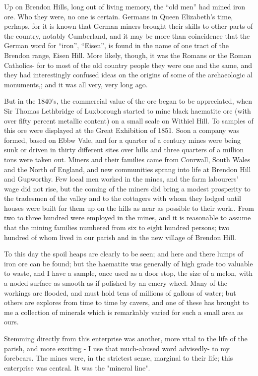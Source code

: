 Up on Brendon Hills, long out of living memory, the “old men” had mined iron ore. Who they were, no one is certain. Germans in Queen Elizabeth’s time, perhaps, for it is known that German miners brought their skills to other parts of the country, notably Cumberland, and it may be more than coincidence that the German word for “iron”, “Eisen”, is found in the name of one tract of the Brendon range, Eisen Hill.  More likely, though, it was the Romans or the Roman Catholics- for to most of the old country people they were one and the same, and they had interestingly confused ideas on the origins of some of the archaeologic al monuments,; and it was all very, very long ago.

But in the 1840’s, the commercial value of the ore began to be appreciated, when Sir Thomas Lethbridge of Luxborough started to mine black haematite ore (with over fifty percent metallic content) on a small scale on Withiel Hill. To samples of this ore were displayed at the Great Exhibition of 1851. Soon a company was formed, based on Ebbw Vale, and for a quarter of a century mines were being sunk or driven in thirty different sites over hills and three quarters of a million tons were taken out. Miners and their families came from Conrwall, South Wales and the North of England, and new communities sprang into life at Brendon Hill and Gupworthy. Few local men worked in the mines, and the farm labourers’ wage did not rise, but the coming of the miners did bring a modest prosperity to the tradesmen of the valley and to the cottagers with whom they lodged until houses were built for them up on the hills as near as possible to their work.. From two to three hundred were employed in the mines, and it is reasonable to assume that the mining families numbered from six to eight hundred persons; two hundred of whom lived in our parish and in the new village of Brendon Hill.

To this day the spoil heaps are clearly to be seen; and here and there lumps of iron ore can be found; but the haematite was generally of high grade too valuable to waste, and I have a sample, once used as a door stop, the size of a melon, with a noded surface as smooth as if polished by an emery wheel. Many of the workings are flooded, and must hold tens of millions of gallons of water; but others are explores from time to time by cavers, and one of these has brought to me a collection of minerals which is remarkably varied for such a small area as ours.

Stemming directly from this enterprise was another, more vital to the life of the parish, and more exciting - I use that much-abused word advisedly- to my forebears. The mines were, in the strictest sense, marginal to their life; this enterprise was central. It was the "mineral line".

